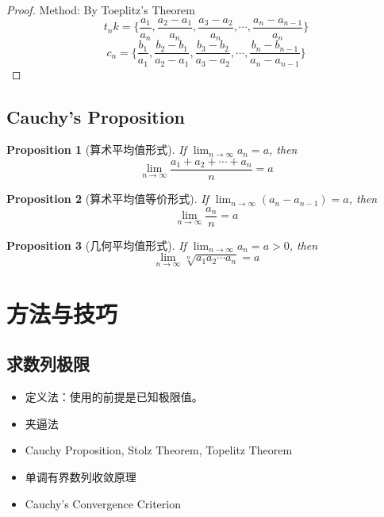\documentclass[onecolumn]{ctexart}
\newtheorem{proposition}{Proposition}
\begin{document}
\begin{proof}
  Method: By Toeplitz's Theorem
  \[
    t_nk = \{\frac{a_1}{a_n}, \frac{a_2 - a_1}{a_n}, \frac{a_3 - a_2}{a_n}, \cdots, \frac{a_n - a_{n-1}}{a_n}\}
  \]
  \[
    c_n = \{\frac{b_1}{a_1}, \frac{b_2 - b_1}{a_2 - a_1}, \frac{b_3 - b_2}{a_3 - a_2}, \cdots, \frac{b_n - b_{n-1}}{a_n - a_{n-1}}\}
  \]
\end{proof}

\subsection{Cauchy's Proposition}

\begin{proposition}[算术平均值形式]
  If $\lim_{n \to \infty} a_n = a$, then
  \[
    \lim_{n \to \infty} \frac{a_1 + a_2 + \cdots + a_n}{n} = a
  \]
\end{proposition}

\begin{proposition}[算术平均值等价形式]
  If $\lim_{n \to \infty} (a_n - a_{n-1}) = a$, then
  \[
    \lim_{n \to \infty} \frac{a_n}{n} = a
  \]
\end{proposition}

\begin{proposition}[几何平均值形式]
  If $\lim_{n \to \infty} a_n = a > 0$, then
  \[
    \lim_{n \to \infty} \sqrt[n]{a_1 a_2 \cdots a_n} = a
  \]
\end{proposition}

\section{方法与技巧}

\subsection{求数列极限}
\begin{itemize}
  \item 定义法：使用的前提是已知极限值。
  \item 夹逼法
  \item Cauchy Proposition, Stolz Theorem, Topelitz Theorem
  \item 单调有界数列收敛原理
  \item Cauchy's Convergence Criterion
\end{itemize}
\end{document}
